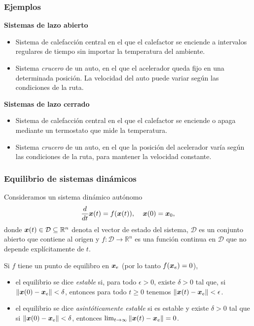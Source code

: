 \documentclass[aspectratio=169,12pt,spanish]{beamer}
\begin{document}

\begin{frame}
\frametitle{Ejemplos}

\textbf{Sistemas de lazo abierto}

\begin{itemize}
\item Sistema de calefacción central en el que el calefactor se enciende a intervalos regulares de tiempo sin importar la temperatura del ambiente.
\item Sistema \emph{crucero} de un auto, en el que el acelerador queda fijo en una determinada posición. La velocidad del auto puede variar según las condiciones de la ruta.
\end{itemize}

\textbf{Sistemas de lazo cerrado}

\begin{itemize}
\item Sistema de calefacción central en el que el calefactor se enciende o apaga mediante un termostato que mide la temperatura.
\item Sistema \emph{crucero} de un auto, en el que la posición del acelerador varía según las condiciones de la ruta, para mantener la velocidad constante.
\end{itemize}



\end{frame}



\begin{frame}
\frametitle{Equilibrio de sistemas dinámicos}

Consideramos un sistema dinámico autónomo
$$
\frac{d}{dt}{\bm{x}(t)} =f(\bm{x}(t)),\;\;\;\;\bm{x}(0)=\bm{x}_{0},
$$
donde $\bm{x}(t) \in {\mathcal {D}}\subseteq \mathbb {R}^{n}$ denota el vector de estado del sistema, ${\mathcal {D}}$ es un conjunto abierto que contiene al origen y  $f:{\mathcal {D}}\rightarrow \mathbb {R}^{n}$ es una función continua en ${\mathcal {D}}$ que no depende explícitamente de $t$.

Si $f$ tiene un punto de equilibro en $\bm{x}_{e}$ (por lo tanto $f(\bm{x}_{e})=0$),
\begin{itemize}
\item el equilibrio se dice \emph{estable} si, para todo $\epsilon >0$, existe $\delta >0$ tal que, si $\|\bm{x}(0)-\bm{x}_{e}\|<\delta$, entonces para todo $t\geq 0$ tenemos $\|\bm{x}(t)-\bm{x}_{e}\|<\epsilon$.
\item el equilibrio se dice \emph{asintóticamente estable} si es estable y existe $\delta >0$ tal que si $\|\bm{x}(0)-\bm{x}_{e}\|<\delta$, entonces $\lim _{t\rightarrow \infty }\|\bm{x}(t)-\bm{x}_{e}\|=0$.
\end{itemize}

\end{frame}
\end{document}
